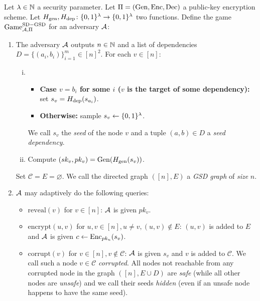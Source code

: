\begin{definition}
	Let $\lambda \in \mathbb{N}$ a security parameter.  Let $\Pi = (\mathrm{Gen}, \mathrm{Enc}, \mathrm{Dec})$ a public-key encryption scheme. Let $H_\mathrm{gen}, H_\mathrm{dep} \colon \{0, 1\}^\lambda \to \{0, 1\}^\lambda$ two functions. Define the game $\mathrm{Game}_{\mathcal{A}, \Pi}^{\mathrm{SD-GSD}}$ for an adversary $\mathcal{A}$:
	\begin{enumerate}[1.]
		\item \label{def:sd-gsd-game-step-1} The adversary $\mathcal{A}$ outputs $n \in \mathbb{N}$ and a list of dependencies $D = \{(a_{i}, b_{i})\}_{i=1}^m \in [n]^2$. For each $v \in [n]$:
		      \begin{enumerate}[(i)]
			      \item \begin{itemize}
				            \item \textbf{Case $v = b_i$ for some $i$ ($v$ is the target of some dependency):} set $s_v = H_\mathrm{dep}(s_{a_i})$.
				            \item \textbf{Otherwise:} sample $s_v \leftarrow \{0, 1\}^\lambda$.
			            \end{itemize}
			            We call $s_v$ the \emph{seed} of the node $v$ and a tuple $(a, b) \in D$ a \emph{seed dependency}.
			      \item Compute $(sk_v, pk_v) = \mathrm{Gen}(H_\mathrm{gen}(s_v))$. 
		      \end{enumerate}
		      Set $\mathcal{C} = E = \varnothing$. We call the directed graph $([n], E)$ a \emph{GSD graph} of \emph{size} $n$.
		\item $\mathcal{A}$ may adaptively do the following queries:
		      \begin{itemize}
			      \item $\mathrm{reveal}(v)$ for $v \in [n]$: $\mathcal{A}$ is given $pk_v$.
			      \item $\mathrm{encrypt}(u, v)$ for $u, v \in [n], u \neq v, (u, v) \notin E$: $(u, v)$ is added to $E$ and $\mathcal{A}$ is given $c \leftarrow \mathrm{Enc}_{pk_u}(s_v)$.
			      \item $\mathrm{corrupt}(v)$ for $v \in [n], v \notin \mathcal{C}$: $\mathcal{A}$ is given $s_v$ and $v$ is added to $\mathcal{C}$. We call such a node $v \in \mathcal{C}$ \emph{corrupted}. All nodes not reachable from any corrupted node in the graph $([n], E \cup D)$ are \emph{safe} (while all other nodes are \emph{unsafe}) and we call their seeds \emph{hidden} (even if an unsafe node happens to have the same seed).
		      \end{itemize}

\end{enumerate}
\end{definition}
